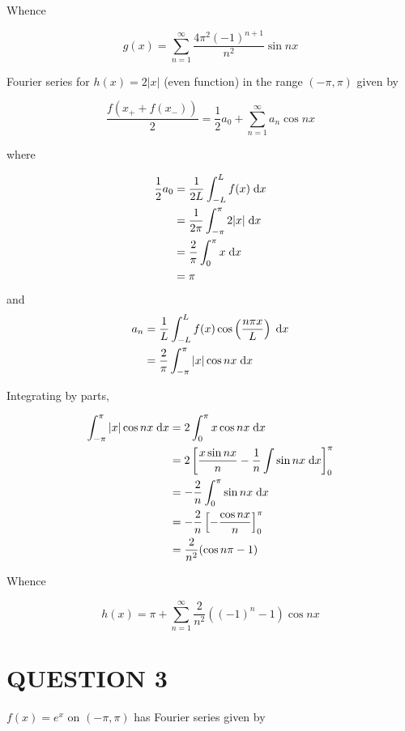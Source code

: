 \documentclass[a4paper]{article}
\begin{document}
Whence 

\[ g(x) = \sum_{n=1}^{\infty} \frac{ 4 \pi^{2} (-1)^{n+1}}{n^{2}} \sin  n x  \]


Fourier series for $ h(x) = 2| x | $ (even function) in the range $ (-\pi,\pi) $ given by


\[ \frac{f(x_{+} + f(x_{-}))}{2} =  \frac{1}{2} a_{0} +  \sum_{n=1}^{\infty} a_{n} \cos  n x   \]


where 

\begin{align*}
\frac{1}{2} a_{0} & = \frac{1}{2L} \int_{-L}^{L} f(x) \; \mathrm{d} x \\
& = \frac{1}{2\pi} \int_{-\pi}^{\pi} 2| x | \; \mathrm{d} x \\
& = \frac{2}{\pi} \int_{0}^{\pi} x \; \mathrm{d} x \\
& = \pi
\end{align*}
and 
\begin{align*}
a_{n} & = \frac{1}{L} \int_{-L}^{L} f(x) \cos \left( \frac{n \pi x}{L} \right) \; \mathrm{d} x  \\
& = \frac{2}{\pi} \int_{-\pi}^{\pi} | x | \cos n x \; \mathrm{d} x
\end{align*}





Integrating by parts,

\begin{align*}
\int_{-\pi}^{\pi} | x | \cos n x \; \mathrm{d} x & = 2 \int_{0}^{\pi} x  \cos n x \; \mathrm{d} x \\
& = 2 \left[ \frac{x \sin n x}{n} - \frac{1}{n} \int \sin n x \; \mathrm{d} x \right]_{0}^{\pi}  \\
& = - \frac{2}{n} \int_{0}^{\pi} \sin n x \; \mathrm{d} x \\
& = - \frac{2}{n} \left[ - \frac{\cos n x}{n} \right]_{0}^{\pi}\\
& = \frac{2}{n^{2}} (\cos n \pi - 1) 
\end{align*}

Whence

\[ h(x) = \pi +  \sum_{n=1}^{\infty} \frac{2}{n^{2}} ((-1)^{n} - 1)  \cos  n x \]







\section{QUESTION 3}


$ f(x) = e^{x} $ on $ (-\pi,\pi) $ has Fourier series given by 
\end{document}
